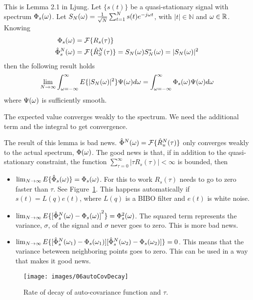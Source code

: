 \begin{lemma}
This is Lemma 2.1 in Ljung.
Let $\{s(t)\}$ be a quasi-stationary signal with spectrum $\Phi_s(\omega)$.
Let $S_N(\omega) = \frac{1}{\sqrt{N}} \sum_{t=1}^N s(t)e^{-j\omega t}$, with $|t|\in\mathbb{N}$ and $\omega\in\mathbb{R}$.
Knowing
\begin{align*}
\Phi_s(\omega) &= \mathcal{F}\{R_s(\tau)\} \\
\hat{\Phi}_s^N(\omega) &= \mathcal{F}\{\hat{R}_S^N(\tau)\} = S_N(\omega)S_N^*(\omega) = |S_N(\omega)|^2
\end{align*}
then the following result holds
$$\lim_{N\to\infty} \int_{\omega=-\infty}^\infty E\{|S_N(\omega)|^2\}\Psi(\omega)d\omega = \int_{\omega=-\infty}^\infty \Phi_s(\omega)\Psi(\omega)d\omega$$
where $\Psi(\omega)$ is sufficiently smooth.
\end{lemma}
The expected value converges weakly to the spectrum.
We need the additional term and the integral to get convergence.

The result of this lemma is bad news.
$\hat{\Phi}^N(\omega) = \mathcal{F}\{\hat{R}_u^N(\tau)\}$ only converges weakly to the actual spectrum, $\Phi(\omega)$.
The good news is that, if in addition to the quasi-stationary constraint, the function $\sum_{\tau=0}^\infty|\tau R_s(\tau)|<\infty$ is bounded, then
\begin{itemize}
\item $\lim_{N\to\infty}E\{\hat{\Phi}_s(\omega)\} = \Phi_s(\omega)$.
      For this to work $R_s(\tau)$ needs to go to zero faster than $\tau$.
      See Figure~\ref{fig:06autoCovDecay}.
      This happens automatically if $s(t)=L(q)e(t)$, where $L(q)$ is a BIBO filter and $e(t)$ is white noise.
\item $\lim_{N\to\infty}E\{{[\hat{\Phi}_s^N(\omega)-\Phi_s(\omega)]}^2\} = \Phi_s^2(\omega)$.
      The squared term represents the variance, $\sigma$, of the signal and $\sigma$ never goes to zero.
      This is more bad news.
\item $\lim_{N\to\infty}E\{[\hat{\Phi}_s^N(\omega_1)-\Phi_s(\omega_1)][\hat{\Phi}_s^N(\omega_2)-\Phi_s(\omega_2)]\} = 0$.
      This means that the variance beteween neighboring points goes to zero.
      This can be used in a way that makes it good news.
\end{itemize}

\begin{figure}[ht!]
\centering
\texttt{[image: images/06autoCovDecay]}
\caption{Rate of decay of auto-covariance function and $\tau$.}
\label{fig:06autoCovDecay}
\end{figure}

